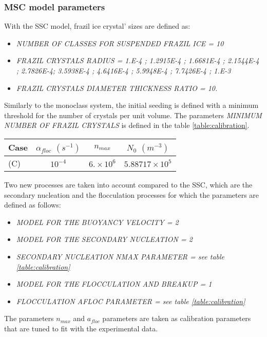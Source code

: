 \subsubsection{MSC model parameters}
With the SSC model, frazil ice crystal' sizes are defined as:
\begin{itemize}
	\item\textit{NUMBER OF CLASSES FOR SUSPENDED FRAZIL ICE = 10}
	\item\textit{FRAZIL CRYSTALS RADIUS = 1.E-4 ; 1.2915E-4 ; 1.6681E-4 ; 2.1544E-4 ; 2.7826E-4;
3.5938E-4 ; 4.6416E-4 ; 5.9948E-4 ; 7.7426E-4 ; 1.E-3}
	\item\textit{FRAZIL CRYSTALS DIAMETER THICKNESS RATIO = 10.}
\end{itemize}

Similarly to the monoclass system, the initial seeding is defined 
with a minimum threshold for the number of crystals per unit volume.
The parameters \textit{MINIMUM NUMBER OF FRAZIL CRYSTALS} is
defined in the table \ref{table:calibration}.

\begin{center}
\begin{tabular}{lccc}
\hline
Case & $\alpha_{floc}$ $(s^{-1})$ & $n_{max}$ & $N_0$ $(m^{-3})$ \\
\hline \hline
(C) & $10^{-4}$ & $6. \times 10^{6}$ & $5.88717 \times 10^{5}$ \\
\hline
\end{tabular}
\label{table:calibration}
\end{center}

Two new processes are taken into account compared to the SSC,
which are the secondary nucleation and the flocculation processes for which
the parameters are defined as follows:
\begin{itemize}
	\item\textit{MODEL FOR THE BUOYANCY VELOCITY = 2}
	\item\textit{MODEL FOR THE SECONDARY NUCLEATION = 2}
	\item\textit{SECONDARY NUCLEATION NMAX PARAMETER = see table \ref{table:calibration}}
	\item\textit{MODEL FOR THE FLOCCULATION AND BREAKUP = 1}
	\item\textit{FLOCCULATION AFLOC PARAMETER = see table \ref{table:calibration}}
\end{itemize}
The parameters $n_{max}$ and $a_{floc}$ parameters are taken as calibration parameters 
that are tuned to fit with the experimental data.

